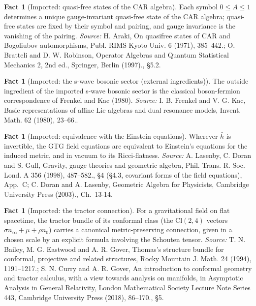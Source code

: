 \documentclass[11pt]{article}
\theoremstyle{definition}
\newtheorem{fact}[theorem]{Fact}
\theoremstyle{plain}
\providecommand{\Cl}{}\renewcommand{\Cl}{\mathrm{Cl}}
\providecommand{\hb}{}\renewcommand{\hb}{\bar{h}}
\providecommand{\nInf}{}\renewcommand{\nInf}{n_\infty}
\providecommand{\nO}{}\renewcommand{\nO}{n_0}
\begin{document}
\begin{fact}[Imported: quasi-free states of the CAR algebra]\label{c:hawking.imported-quasi-free-states-car-algebra}
Each symbol $0 \le A \le 1$ determines a unique gauge-invariant quasi-free state of the CAR algebra; quasi-free states are fixed by their symbol and pairing, and gauge invariance is the vanishing of the pairing.
\emph{Source:} H. Araki, On quasifree states of CAR and Bogoliubov automorphisms, Publ. RIMS Kyoto Univ. 6 (1971), 385--442.; O. Bratteli and D. W. Robinson, Operator Algebras and Quantum Statistical Mechanics 2, 2nd ed., Springer, Berlin (1997)., \S 5.2.
\end{fact}

\begin{fact}[Imported: the s-wave bosonic sector (external ingredients)]\label{c:hawking.imported-s-wave-bosonic-sector-external}
The outside ingredient of the imported s-wave bosonic sector is the classical boson-fermion correspondence of Frenkel and Kac (1980).
\emph{Source:} I. B. Frenkel and V. G. Kac, Basic representations of affine Lie algebras and dual resonance models, Invent. Math. 62 (1980), 23--66..
\end{fact}

\begin{fact}[Imported: equivalence with the Einstein equations]\label{c:interior.imported-equivalence-einstein-equations}
Wherever $\hb$ is invertible, the GTG field equations are equivalent to Einstein's equations for the induced metric, and in vacuum to its Ricci-flatness.
\emph{Source:} A. Lasenby, C. Doran and S. Gull, Gravity, gauge theories and geometric algebra, Phil. Trans. R. Soc. Lond. A 356 (1998), 487--582., \S 4 (\S 4.3, covariant forms of the field equations), App.~C; C. Doran and A. Lasenby, Geometric Algebra for Physicists, Cambridge University Press (2003)., Ch.~13-14.
\end{fact}

\begin{fact}[Imported: the tractor connection]\label{c:interior.imported-tractor-connection}
For a gravitational field on flat spacetime, the tractor bundle of its conformal class (the $\Cl(2,4)$ vectors $\sigma\nInf + \mu + \rho\nO$) carries a canonical metric-preserving connection, given in a chosen scale by an explicit formula involving the Schouten tensor.
\emph{Source:} T. N. Bailey, M. G. Eastwood and A. R. Gover, Thomas's structure bundle for conformal, projective and related structures, Rocky Mountain J. Math. 24 (1994), 1191--1217.; S. N. Curry and A. R. Gover, An introduction to conformal geometry and tractor calculus, with a view towards analysis on manifolds, in Asymptotic Analysis in General Relativity, London Mathematical Society Lecture Note Series 443, Cambridge University Press (2018), 86--170., \S 5.
\end{fact}
\end{document}
